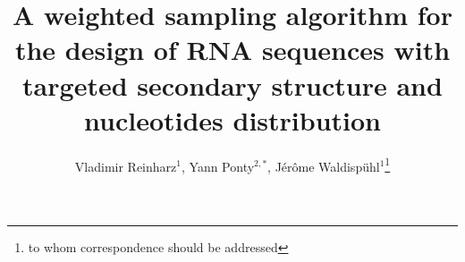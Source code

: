 \documentclass{bioinfo}
\begin{document}

\title{A weighted sampling algorithm for the design of RNA sequences with targeted secondary structure and nucleotides distribution}
\author{Vladimir Reinharz$^1$, Yann Ponty$^{2,*}$, J\'er\^{o}me Waldisp\"{u}hl$^{1}$\footnote{to whom correspondence should be addressed}}
\address{$^1$ School of Computer Science, McGill University, Montreal, Canada\\ $^2$ Laboratoire d'informatique, \'Ecole Polytechnique, Palaiseau, France.}



\maketitle
\end{document}
